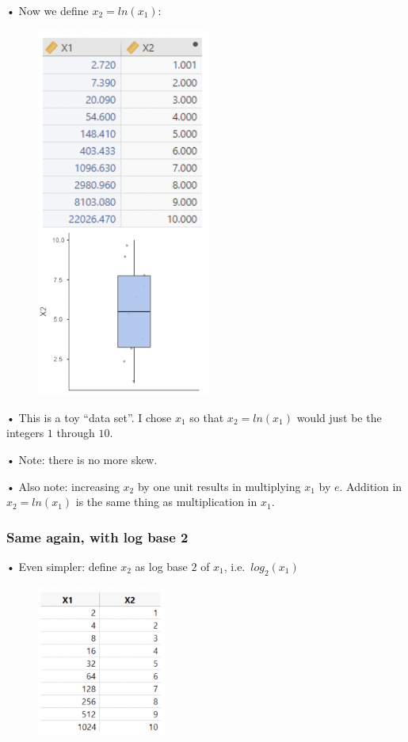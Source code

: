 \documentclass[
  letterpaper,
  DIV=11,
  numbers=noendperiod]{scrreprt}
\begin{document}
• Now we define \(x_2 = ln(x_1)\):

\begin{figure}

\includegraphics[width=2.25in,height=\textheight]{images/mod4_pt2_2.png} \hfill{}

\end{figure}

• This is a toy ``data set''. I chose \(x_1\) so that \(x_2 = ln(x_1)\)
would just be the integers \(1\) through \(10\).

• Note: there is no more skew.

• Also note: increasing \(x_2\) by one unit results in multiplying
\(x_1\) by \(e\). Addition in \(x_2 = ln(x_1)\) is the same thing as
multiplication in \(x_1\).

\hypertarget{same-again-with-log-base-2}{%
\subsubsection{Same again, with log base
2}\label{same-again-with-log-base-2}}

• Even simpler: define \(x_2\) as log base \(2\) of \(x_1\),
i.e.~\(log_2(x_1)\)

\begin{figure}

\includegraphics[width=1.6875in,height=\textheight]{images/mod4_pt2_3.png} \hfill{}

\end{figure}
\end{document}
